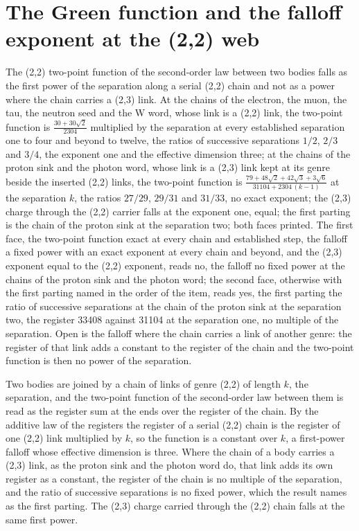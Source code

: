 \section{The Green function and the falloff exponent at the (2,2) web}\label{mod:V-11-D543290-w-grfn}
\begin{chwall}\label{box:V-11-D543290-w-grfn:1}
The (2,2) two-point function of the second-order law between two bodies falls as the first power of the separation along a serial (2,2) chain and not as a power where the chain carries a (2,3) link. At the chains of the electron, the muon, the tau, the neutron seed and the W word, whose link is a (2,2) link, the two-point function is $\tfrac{30 + 30\sqrt{2}}{2304}$ multiplied by the separation at every established separation one to four and beyond to twelve, the ratios of successive separations $1/2$, $2/3$ and $3/4$, the exponent one and the effective dimension three; at the chains of the proton sink and the photon word, whose link is a (2,3) link kept at its genre beside the inserted (2,2) links, the two-point function is $\tfrac{79 + 48\sqrt{2} + 42\sqrt{3} + 3\sqrt{6}}{31104 + 2304\,(k-1)}$ at the separation $k$, the ratios $27/29$, $29/31$ and $31/33$, no exact exponent; the (2,3) charge through the (2,2) carrier falls at the exponent one, equal; the first parting is the chain of the proton sink at the separation two; both faces printed.
The first face, the two-point function exact at every chain and established step, the falloff a fixed power with an exact exponent at every chain and beyond, and the (2,3) exponent equal to the (2,2) exponent, reads no, the falloff no fixed power at the chains of the proton sink and the photon word; the second face, otherwise with the first parting named in the order of the item, reads yes, the first parting the ratio of successive separations at the chain of the proton sink at the separation two, the register 33408 against 31104 at the separation one, no multiple of the separation. Open is the falloff where the chain carries a link of another genre: the register of that link adds a constant to the register of the chain and the two-point function is then no power of the separation.
\end{chwall}
Two bodies are joined by a chain of links of genre (2,2) of length $k$, the separation, and the two-point function of the second-order law between them is read as the register sum at the ends over the register of the chain. By the additive law of the registers the register of a serial (2,2) chain is the register of one (2,2) link multiplied by $k$, so the function is a constant over $k$, a first-power falloff whose effective dimension is three. Where the chain of a body carries a (2,3) link, as the proton sink and the photon word do, that link adds its own register as a constant, the register of the chain is no multiple of the separation, and the ratio of successive separations is no fixed power, which the result names as the first parting. The (2,3) charge carried through the (2,2) chain falls at the same first power.
